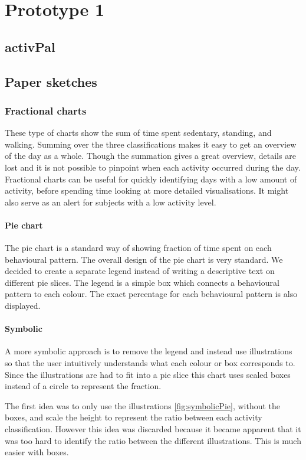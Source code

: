 \chapter{Prototype 1}

\section{activPal}

\section{Paper sketches}

\subsection{Fractional charts}
These type of charts show the sum of time spent sedentary, standing, and walking. Summing over the three classifications makes it easy to get an overview of the day as a whole. Though the summation gives a great overview, details are lost and it is not possible to pinpoint when each activity occurred during the day. Fractional charts can be useful for quickly identifying days with a low amount of activity, before spending time looking at more detailed visualisations. It might also serve as an alert for subjects with a low activity level.

\subsubsection{Pie chart}
The pie chart is a standard way of showing fraction of time spent on each behavioural pattern. The overall design of the pie chart is very standard. We decided to create a separate legend instead of writing a descriptive text on different pie slices. The legend is a simple box which connects a behavioural pattern to each colour. The exact percentage for each behavioural pattern is also displayed.

\subsubsection{Symbolic}
A more symbolic approach is to remove the legend and instead use illustrations so that the user intuitively understands what each colour or box corresponds to. Since the illustrations are had to fit into a pie slice this chart uses scaled boxes instead of a circle to represent the fraction. 

The first idea was to only use the illustrations \ref{fig:symbolicPie}, without the boxes, and scale the height to represent the ratio between each activity classification. However this idea was discarded because it became apparent that it was too hard to identify the ratio between the different illustrations. This is much easier with boxes.


